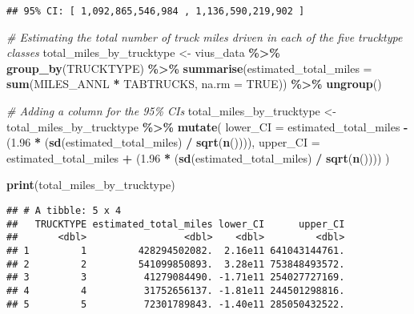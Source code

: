 \documentclass[
]{article}
\newenvironment{Shaded}{\begin{snugshade}}{\end{snugshade}}
\newcommand{\AttributeTok}[1]{\textcolor[rgb]{0.13,0.29,0.53}{#1}}
\newcommand{\CommentTok}[1]{\textcolor[rgb]{0.56,0.35,0.01}{\textit{#1}}}
\newcommand{\ConstantTok}[1]{\textcolor[rgb]{0.56,0.35,0.01}{#1}}
\newcommand{\FloatTok}[1]{\textcolor[rgb]{0.00,0.00,0.81}{#1}}
\newcommand{\FunctionTok}[1]{\textcolor[rgb]{0.13,0.29,0.53}{\textbf{#1}}}
\newcommand{\NormalTok}[1]{#1}
\newcommand{\OtherTok}[1]{\textcolor[rgb]{0.56,0.35,0.01}{#1}}
\newcommand{\SpecialCharTok}[1]{\textcolor[rgb]{0.81,0.36,0.00}{\textbf{#1}}}
\begin{document}
\begin{verbatim}
## 95% CI: [ 1,092,865,546,984 , 1,136,590,219,902 ]
\end{verbatim}

\begin{Shaded}
\begin{Highlighting}[]
\CommentTok{\# Estimating the total number of truck miles driven in each of the five trucktype classes}
\NormalTok{total\_miles\_by\_trucktype }\OtherTok{\textless{}{-}}\NormalTok{ vius\_data }\SpecialCharTok{\%\textgreater{}\%}
  \FunctionTok{group\_by}\NormalTok{(TRUCKTYPE) }\SpecialCharTok{\%\textgreater{}\%}
  \FunctionTok{summarise}\NormalTok{(}\AttributeTok{estimated\_total\_miles =} \FunctionTok{sum}\NormalTok{(MILES\_ANNL }\SpecialCharTok{*}\NormalTok{ TABTRUCKS, }\AttributeTok{na.rm =} \ConstantTok{TRUE}\NormalTok{)) }\SpecialCharTok{\%\textgreater{}\%}
  \FunctionTok{ungroup}\NormalTok{()}

\CommentTok{\# Adding a column for the 95\% CIs}
\NormalTok{total\_miles\_by\_trucktype }\OtherTok{\textless{}{-}}\NormalTok{ total\_miles\_by\_trucktype }\SpecialCharTok{\%\textgreater{}\%}
  \FunctionTok{mutate}\NormalTok{(}
    \AttributeTok{lower\_CI =}\NormalTok{ estimated\_total\_miles }\SpecialCharTok{{-}}\NormalTok{ (}\FloatTok{1.96} \SpecialCharTok{*}\NormalTok{ (}\FunctionTok{sd}\NormalTok{(estimated\_total\_miles) }\SpecialCharTok{/} \FunctionTok{sqrt}\NormalTok{(}\FunctionTok{n}\NormalTok{()))),}
    \AttributeTok{upper\_CI =}\NormalTok{ estimated\_total\_miles }\SpecialCharTok{+}\NormalTok{ (}\FloatTok{1.96} \SpecialCharTok{*}\NormalTok{ (}\FunctionTok{sd}\NormalTok{(estimated\_total\_miles) }\SpecialCharTok{/} \FunctionTok{sqrt}\NormalTok{(}\FunctionTok{n}\NormalTok{())))}
\NormalTok{  )}

\FunctionTok{print}\NormalTok{(total\_miles\_by\_trucktype)}
\end{Highlighting}
\end{Shaded}

\begin{verbatim}
## # A tibble: 5 x 4
##   TRUCKTYPE estimated_total_miles lower_CI      upper_CI
##       <dbl>                 <dbl>    <dbl>         <dbl>
## 1         1         428294502082.  2.16e11 641043144761.
## 2         2         541099850893.  3.28e11 753848493572.
## 3         3          41279084490. -1.71e11 254027727169.
## 4         4          31752656137. -1.81e11 244501298816.
## 5         5          72301789843. -1.40e11 285050432522.
\end{verbatim}
\end{document}
